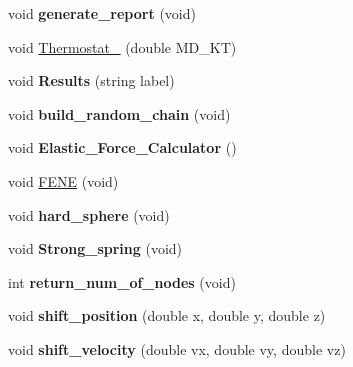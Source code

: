 \begin{DoxyCompactItemize}
\item 
void {\bfseries generate\+\_\+report} (void)\hypertarget{classChromatin_a0c988a3b80895ed2c070625646d8ccd3}{}\label{classChromatin_a0c988a3b80895ed2c070625646d8ccd3}

\item 
void \hyperlink{classChromatin_a0b9c6938baef5531ed325bc431e5636f}{Thermostat\+\_} (double M\+D\+\_\+\+KT)
\item 
void {\bfseries Results} (string label)\hypertarget{classChromatin_a93559682020c26033dc0b4cdbff774f9}{}\label{classChromatin_a93559682020c26033dc0b4cdbff774f9}

\item 
void {\bfseries build\+\_\+random\+\_\+chain} (void)\hypertarget{classChromatin_ae3f17fd0b51db84a3890105f8f4a7028}{}\label{classChromatin_ae3f17fd0b51db84a3890105f8f4a7028}

\item 
void {\bfseries Elastic\+\_\+\+Force\+\_\+\+Calculator} ()\hypertarget{classChromatin_a014c2f761e8c351e7587204687ac8d1e}{}\label{classChromatin_a014c2f761e8c351e7587204687ac8d1e}

\item 
void \hyperlink{classChromatin_a22b0a397c521e9775a0fedc027aaf709}{F\+E\+NE} (void)
\item 
void {\bfseries hard\+\_\+sphere} (void)\hypertarget{classChromatin_aba53b27dd0a93bbd93fe619390e54749}{}\label{classChromatin_aba53b27dd0a93bbd93fe619390e54749}

\item 
void {\bfseries Strong\+\_\+spring} (void)\hypertarget{classChromatin_a9f8de53b9b39438ed966a9ad7cd5c962}{}\label{classChromatin_a9f8de53b9b39438ed966a9ad7cd5c962}

\item 
int {\bfseries return\+\_\+num\+\_\+of\+\_\+nodes} (void)\hypertarget{classChromatin_adaea32233fd4347b7ba86fb9df18ed18}{}\label{classChromatin_adaea32233fd4347b7ba86fb9df18ed18}

\item 
void {\bfseries shift\+\_\+position} (double x, double y, double z)\hypertarget{classChromatin_a701278cbb0c1014ae62f479e2a9f6737}{}\label{classChromatin_a701278cbb0c1014ae62f479e2a9f6737}

\item 
void {\bfseries shift\+\_\+velocity} (double vx, double vy, double vz)\hypertarget{classChromatin_a49adafb5a81413b23a66f3a59d49d59c}{}\label{classChromatin_a49adafb5a81413b23a66f3a59d49d59c}


\end{DoxyCompactItemize}
